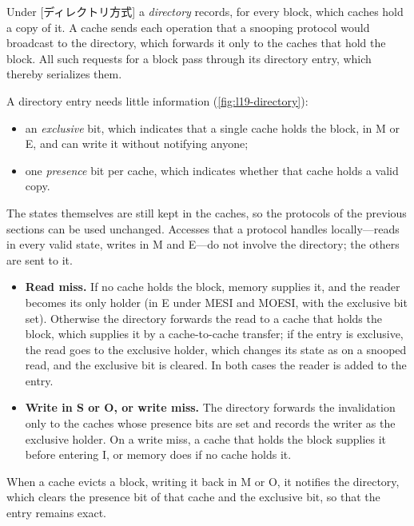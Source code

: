 \documentclass[../main.tex]{subfiles}
\begin{document}
\begin{definition}
  Under [ディレクトリ方式] a
  \emph{directory} records, for every block, which caches hold a copy of it.
  A cache sends each operation that a snooping protocol would broadcast to the
  directory, which forwards it only to the caches that hold the block.  All
  such requests for a block pass through its directory entry, which thereby
  serializes them.
\end{definition}

A directory entry needs little information (\cref{fig:l19-directory}):
\begin{itemize}
  \item an \emph{exclusive} bit, which indicates that a single cache holds
    the block, in M or E, and can write it without notifying
    anyone;
  \item one \emph{presence} bit per cache, which indicates whether that cache
    holds a valid copy.
\end{itemize}
The states themselves are still kept in the caches, so the protocols of the
previous sections can be used unchanged.  Accesses that a protocol handles
locally---reads in every valid state, writes in M and E---do not involve the
directory; the others are sent to it.
\begin{itemize}
  \item \textbf{Read miss.}  If no cache holds the block, memory supplies
    it, and the reader becomes its only holder (in E under MESI and MOESI,
    with the exclusive bit set).  Otherwise the directory forwards the read to
    a cache that holds the block, which supplies it by a cache-to-cache
    transfer; if the entry is exclusive, the read goes to the exclusive
    holder, which changes its state as on a snooped read, and the exclusive
    bit is cleared.  In both cases the reader is added to the
    entry.
  \item \textbf{Write in S or O, or write miss.}  The directory forwards the
    invalidation only to the caches whose presence bits are set and records
    the writer as the exclusive holder.  On a write miss, a cache that holds
    the block supplies it before entering I, or memory does if no cache holds
    it.
\end{itemize}
When a cache evicts a block, writing it back in M or O, it notifies the
directory, which clears the presence bit of that cache and the exclusive
bit, so that the entry remains exact.
\end{document}

